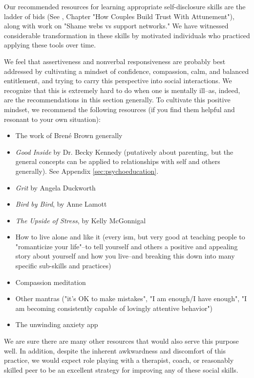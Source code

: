 \documentclass[12pt,letterpaper]{book}
\begin{document}
Our recommended resources for learning appropriate self-disclosure skills are the ladder of bids (See \textcite{gottmanTrust}, Chapter "How Couples Build Trust With Attunement"), along with \textcite{brownDaring} work on "Shame webs vs support networks." We have witnessed considerable transformation in these skills by motivated individuals who practiced applying these tools over time.

We feel that assertiveness and nonverbal responsiveness are probably best addressed by cultivating a mindset of confidence, compassion, calm, and balanced entitlement, and trying to carry this perspective into social interactions. We recognize that this is extremely hard to do when one is mentally ill–as, indeed, are the recommendations in this section generally. To cultivate this positive mindset, we recommend the following resources (if you find them helpful and resonant to your own situation):
\begin{itemize}
	\item The work of Bren{\'e} Brown generally
	\item \textit{Good Inside} by Dr. Becky Kennedy (putatively about parenting, but the general concepts can be applied to relationships with self and others generally). See Appendix \ref{sec:psychoeducation}.
	\item \textit{Grit} by Angela Duckworth
	\item \textit{Bird by Bird}, by Anne Lamott
	\item \textit{The Upside of Stress}, by Kelly McGonnigal
	\item How to live alone and like it (every ism, but very good at teaching people to "romanticize your life"–to tell yourself and others a positive and appealing story about yourself and how you live–and breaking this down into many specific sub-skills and practices)
	\item Compassion meditation
	\item Other mantras ("it's OK to make mistakes", "I am enough/I have enough", "I am becoming consistently capable of lovingly attentive behavior")
	\item The unwinding anxiety app
\end{itemize}

We are sure there are many other resources that would also serve this purpose well. In addition, despite the inherent awkwardness and discomfort of this practice, we would expect role playing with a therapist, coach, or reasonably skilled peer to be an excellent strategy for improving any of these social skills.
\end{document}
